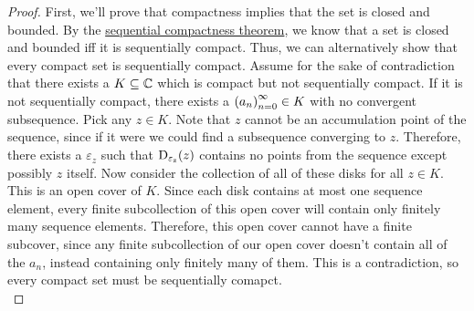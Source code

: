 \begin{proof}
First, we'll prove that compactness implies that the set is closed and bounded. By the \hyperlink{Sequential Compactness Theorem}{sequential compactness theorem}, we know that a set is closed and bounded iff it is sequentially compact. Thus, we can alternatively show that every compact set is sequentially compact. Assume for the sake of contradiction that there exists a $K \subseteq \C$ which is compact but not sequentially compact. If it is not sequentially compact, there exists a $\seq{a} \in K$ with no convergent subsequence. Pick any $z \in K$. Note that $z$ cannot be an accumulation point of the sequence, since if it were we could find a subsequence converging to $z$. Therefore, there exists a $\varepsilon_z$ such that $\disk{z}{\varepsilon_z}$ contains no points from the sequence except possibly $z$ itself. Now consider the collection of all of these disks for all $z \in K$. This is an open cover of $K$. Since each disk contains at most one sequence element, every finite subcollection of this open cover will contain only finitely many sequence elements. Therefore, this open cover cannot have a finite subcover, since any finite subcollection of our open cover doesn't contain all of the $a_n$, instead containing only finitely many of them. This is a contradiction, so every compact set must be sequentially comapct.\\

\end{proof}
